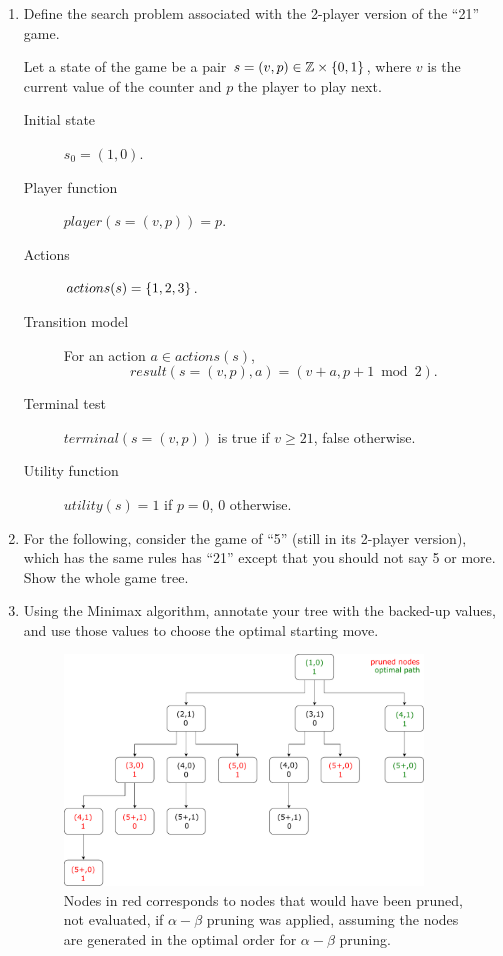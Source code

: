 \documentclass[11pt, a4paper]{article}
\begin{document}
\begin{enumerate}
    \item Define the search problem associated with the 2-player version of the \enquote{21} game.

    \begin{solution}
        Let a state of the game be a pair $s = (v, p) \in \mathbb{Z} \times \{0, 1\}$, where $v$ is the current value of the counter and $p$ the player to play next.
        \begin{description}
            \item[Initial state] $s_0 = (1, 0)$.
            \item[Player function] $player(s = (v, p)) = p$.
            \item[Actions] $actions(s) = \{1, 2, 3\}$.
            \item[Transition model] For an action $a \in actions(s)$, $$result(s = (v, p), a) = (v + a,  p + 1 \bmod 2).$$
            \item[Terminal test] $terminal(s = (v, p))$ is true if $v \geq 21$, false otherwise.
            \item[Utility function] $utility(s) = 1$ if $p = 0$, $0$ otherwise.
        \end{description}
    \end{solution}

    \item For the following, consider the game of \enquote{5} (still in its 2-player version), which has the same rules has \enquote{21} except that you should not say 5 or more. Show the whole game tree.
    \item Using the Minimax algorithm, annotate your tree with the backed-up values, and use those values to choose the optimal starting move.

    \begin{solution}
        \begin{figure}[H]
            \centering
            \includegraphics[width=0.9\textwidth]{figures/e2_21.pdf}
            \caption{Nodes in red corresponds to nodes that would have been pruned, \ie{} not evaluated, if $\alpha - \beta$ pruning was applied, assuming the nodes are generated in the optimal order for $\alpha - \beta$ pruning.}
        \end{figure}
    \end{solution}
\end{enumerate}
\end{document}
